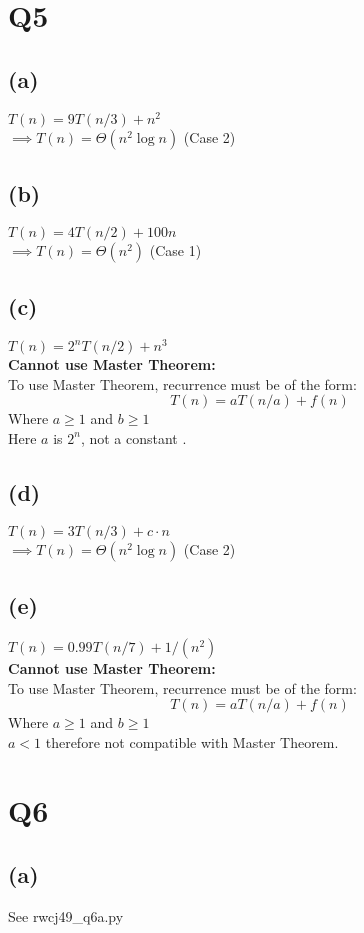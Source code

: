\documentclass[12pt]{article}%
\begin{document}
\section*{Q5}
\subsection*{(a)}
$T(n) = 9T(n/3) + n^2$\\
\bigskip
$\implies T(n) = \Theta(n^2 \log n)$ (Case 2)

\subsection*{(b)}
$T(n) = 4T(n/2) + 100n$ \\
\bigskip
$\implies T(n) = \Theta(n^2)$ (Case 1)


\subsection*{(c)}
$T(n) = 2^nT(n/2) + n^3$\\
\textbf{Cannot use Master Theorem:} \\
\noindent
To use Master Theorem, recurrence must be of the form:
$$T(n) = aT(n/a) + f(n)$$ Where $a \geq 1$ and $b \geq 1$\\
Here $a$ is $2^n$, not a constant .
\subsection*{(d)}
$T(n) = 3T(n/3) + c\cdot n$\\
\bigskip
$\implies T(n) = \Theta(n^2 \log n)$ (Case 2)

\subsection*{(e)}
$T(n) = 0.99T(n/7) + 1/(n^2)$ \\
\textbf{Cannot use Master Theorem:} \\
\noindent
To use Master Theorem, recurrence must be of the form:
$$T(n) = aT(n/a) + f(n)$$ Where $a \geq 1$ and $b \geq 1$\\
$a < 1$ therefore not compatible with Master Theorem.
\section*{Q6}
\subsection*{(a)}
See rwcj49\_q6a.py
\end{document}
